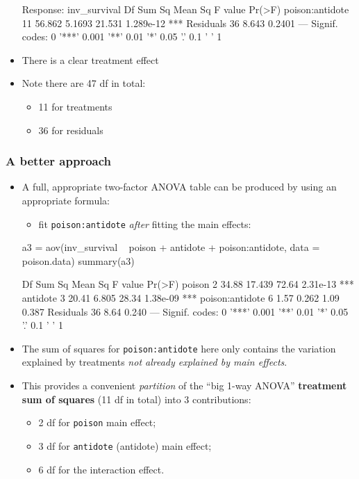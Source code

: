\documentclass[a4paper]{article}
\begin{document}
\begin{itemize}
\begin{Schunk}
\begin{Soutput}
Response: inv_survival
                Df Sum Sq Mean Sq F value    Pr(>F)    
poison:antidote 11 56.862  5.1693  21.531 1.289e-12 ***
Residuals       36  8.643  0.2401                      
---
Signif. codes:  0 '***' 0.001 '**' 0.01 '*' 0.05 '.' 0.1 ' ' 1
\end{Soutput}
\end{Schunk}
	\item There is a clear treatment effect
	\item Note there are 47 df in total:
	\begin{itemize}
		\item 11 for treatments
		\item 36 for residuals
	\end{itemize}
\end{itemize}
\subsubsection{A better approach}
\begin{itemize}
	\item A full, appropriate two-factor ANOVA table can be produced by using an appropriate formula:
	\begin{itemize}
		\item fit \lstinline|poison:antidote| \textit{after}  fitting the main effects:
	\end{itemize}
\begin{Schunk}
\begin{Sinput}
a3 = aov(inv_survival ~ poison + antidote + poison:antidote, 
         data = poison.data)
summary(a3)
\end{Sinput}
\begin{Soutput}
                Df Sum Sq Mean Sq F value   Pr(>F)    
poison           2  34.88  17.439   72.64 2.31e-13 ***
antidote         3  20.41   6.805   28.34 1.38e-09 ***
poison:antidote  6   1.57   0.262    1.09    0.387    
Residuals       36   8.64   0.240                     
---
Signif. codes:  0 '***' 0.001 '**' 0.01 '*' 0.05 '.' 0.1 ' ' 1
\end{Soutput}
\end{Schunk}
	\item The sum of squares for \lstinline|poison:antidote| here only contains the variation explained by treatments \textit{not already explained by main effects}.
	\item This provides a convenient \textit{partition} of the ``big 1-way ANOVA'' \textbf{treatment sum of squares} (11 df in total) into 3 contributions:
	\begin{itemize}
		\item 2 df for \lstinline|poison| main effect;
		\item 3 df for \lstinline|antidote| (antidote) main effect;
		\item 6 df for the interaction effect.
	\end{itemize}
\end{itemize}
\end{document}
